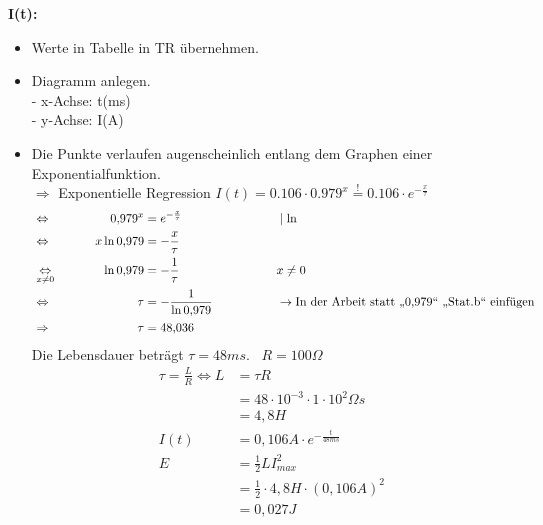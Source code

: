 \documentclass{article}
\begin{document}
	\newpage
	\textbf{I(t):}
	\begin{itemize}
		\item Werte in Tabelle in TR übernehmen.
		\item Diagramm anlegen.\\
		- x-Achse: t(ms)\\
		- y-Achse: I(A)
		\item Die Punkte verlaufen augenscheinlich entlang dem Graphen einer Exponentialfunktion.\\
		$\Rightarrow$ Exponentielle Regression $I(t) = 0.106 \cdot 0.979^x \overset{!}{=} 0.106 \cdot e^{- \frac{x}{\tau}}$
		\vspace{0cm}
		\begin{alignat}{3}
			&\Leftrightarrow \hspace{1cm}
			& 0{,}979^x  &= e^{-\frac{x}{\tau}} &\hspace{1.5cm} &\mid \ln \\
			&\Leftrightarrow & x \ln 0{,}979  &= -\frac{x}{\tau} \\
			&	\underset{x \neq 0}{\Leftrightarrow} & \ln 0{,}979    &= -\frac{1}{\tau}  &\qquad & x \neq 0 \\
			&\Leftrightarrow & \tau &= -\frac{1}{\ln 0{,}979} &\qquad &\rightarrow \text{In der Arbeit statt „0,979“ „Stat.b“ einfügen} \\
			&\Rightarrow & \tau &= 48{,}036
		\end{alignat}
		Die Lebensdauer beträgt $\tau = 48ms$. 
		$R = 100 \Omega$
		\begin{align}
			\tau = \frac{L}{R} \Leftrightarrow L &= \tau R\\
			&= 48 \cdot 10^{-3} \cdot1 \cdot 10^2 \Omega s \\
			&= 4,8 H\\ 
			I (t) &= 0,106 A \cdot e^{- \frac{t}{48ms}}\\
			E &= \frac{1}{2} L I^2_{max}\\
			&= \frac{1}{2} \cdot 4,8H \cdot (0,106 A)^2\\
			&= 0,027 J
		\end{align}
	\end{itemize}
	
\end{document}
